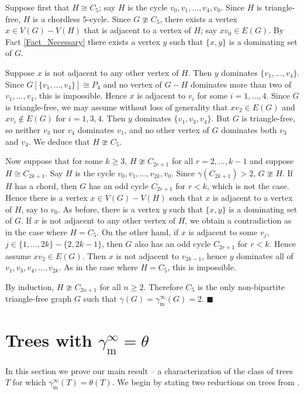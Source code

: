 \documentclass[12pt]{article}%
\begin{document}
Suppose first that $H\cong C_{5}$; say $H$ is the cycle $v_{0},v_{1}%
,...,v_{4},v_{0}$. Since $H$ is triangle-free, $H$ is a chordless $5$-cycle.
Since $G\ncong C_{5}$, there exists a vertex $x\in V(G)-V(H)$ that is adjacent
to a vertex of $H$; say $xv_{0}\in E(G)$. By Fact \ref{Fact_Necessary} there
exists a vertex $y$ such that $\{x,y\}$ is a dominating set of $G$.

Suppose $x$ is not adjacent to any other vertex of $H$. Then $y$ dominates
$\{v_{1},...,v_{4}\}$. Since $G[\{v_{1},...,v_{4}\}]\cong P_{4}$ and no vertex
of $G-H$ dominates more than two of $v_{1},...,v_{4}$, this is impossible.
Hence $x$ is adjacent to $v_{i}$ for some $i=1,...,4$. Since $G$ is
triangle-free, we may assume without loss of generality that $xv_{2}\in E(G)$
and $xv_{i}\notin E(G)$ for $i=1,3,4$. Then $y$ dominates $\{v_{1},v_{3}%
,v_{4}\}$. But $G$ is triangle-free, so neither $v_{3}$ nor $v_{4}$ dominates
$v_{1}$, and no other vertex of $G$ dominates both $v_{3}$ and $v_{4}$. We
deduce that $H\ncong C_{5}$.

Now suppose that for some $k\geq3$, $H\ncong C_{2r+1}$ for all $r=2,...,k-1$
and suppose $H\cong C_{2k+1}$. Say $H$ is the cycle $v_{0},v_{1}%
,...,v_{2k},v_{0}$. Since $\gamma(C_{2k+1})>2$, $G\ncong H$. If $H$ has a
chord, then $G$ has an odd cycle $C_{2r+1}$ for $r<k$, which is not the case.
Hence there is a vertex $x\in V(G)-V(H)$ such that $x$ is adjacent to a vertex
of $H$, say to $v_{0}$. As before, there is a vertex $y$ such that $\{x,y\}$
is a dominating set of $G$. If $x$ is not adjacent to any other vertex of $H$,
we obtain a contradiction as in the case where $H=C_{5}$. On the other hand,
if $x$ is adjacent to some $v_{j}$, $j\in\{1,...,2k\}-\{2,2k-1\}$, then $G$
also has an odd cycle $C_{2r+1}$ for $r<k$. Hence assume $xv_{2}\in E(G)$.
Then $x$ is not adjacent to $v_{2k-1}$, hence $y$ dominates all of
$v_{1},v_{3},v_{4},...,v_{2k}$. As in the case where $H=C_{5}$, this is impossible.

By induction, $H\ncong C_{2n+1}$ for all $n\geq2$. Therefore $C_{5}$ is the
only non-bipartite triangle-free graph $G$ such that $\gamma(G)=\gamma
_{\mathrm{m}}^{\infty}(G)=2$. \hfill$\blacksquare$

\section{Trees with $\gamma_{\mathrm{m}}^{\infty}=\theta$}

\label{SecTrees}In this section we prove our main result -- a characterization
of the class of trees $T$ for which $\gamma_{\mathrm{m}}^{\infty}%
(T)=\theta(T)$. We begin by stating two reductions on trees from \cite{KM2}.
\end{document}
